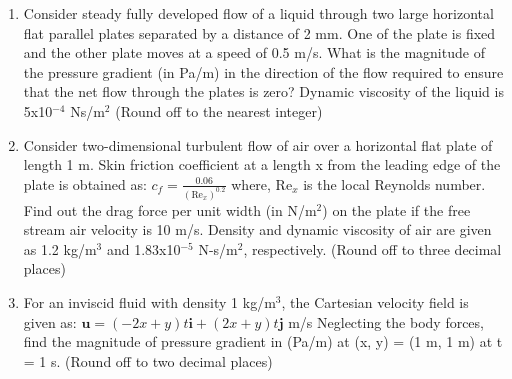 \documentclass[a4paper,10pt]{article}
\begin{document}
\begin{enumerate}
\begin{enumerate}
\end{enumerate}

\item Consider steady fully developed flow of a liquid through two large horizontal flat parallel plates separated by a distance of 2 mm. One of the plate is fixed and the other plate moves at a speed of 0.5 m/s. What is the magnitude of the pressure gradient (in Pa/m) in the direction of the flow required to ensure that the net flow through the plates is zero?
Dynamic viscosity of the liquid is 5x10$^{-4}$ Ns/m$^2$
(Round off to the nearest integer)

\hfill{}

\item Consider two-dimensional turbulent flow of air over a horizontal flat plate of length 1 m. Skin friction coefficient at a length x from the leading edge of the plate is obtained as:
$c_f = \frac{0.06}{(\text{Re}_x)^{0.2}}$
where, Re$_x$ is the local Reynolds number.
Find out the drag force per unit width (in N/m$^2$) on the plate if the free stream air velocity is 10 m/s.
Density and dynamic viscosity of air are given as 1.2 kg/m$^3$ and 1.83x10$^{-5}$ N-s/m$^2$, respectively.
(Round off to three decimal places)

\hfill{}

\item For an inviscid fluid with density 1 kg/m$^3$, the Cartesian velocity field is given as:
$\mathbf{u} = (-2x+y)t\mathbf{i} + (2x+y)t\mathbf{j}$ m/s
Neglecting the body forces, find the magnitude of pressure gradient in (Pa/m) at (x, y) = (1 m, 1 m) at t = 1 s.
(Round off to two decimal places)


\end{enumerate}
\end{document}
